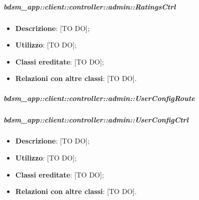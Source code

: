 		\subparagraph{bdsm\_app::client::controller::admin::RatingsCtrl} %
		\label{subp:bdsm_app_client_controller_admin_ratingsctrl}
			\begin{itemize}
				\item \textbf{Descrizione}: [TO DO];
				\item \textbf{Utilizzo}: [TO DO];
				\item \textbf{Classi ereditate}: [TO DO];
				\item \textbf{Relazioni con altre classi}: [TO DO].
			\end{itemize}

		\subparagraph{bdsm\_app::client::controller::admin::UserConfigRoute} %
		\label{subp:bdsm_app_client_controller_admin_userconfigroute}
		

		\subparagraph{bdsm\_app::client::controller::admin::UserConfigCtrl} %
		\label{subp:bdsm_app_client_controller_admin_userconfigctrl}
			\begin{itemize}
				\item \textbf{Descrizione}: [TO DO];
				\item \textbf{Utilizzo}: [TO DO];
				\item \textbf{Classi ereditate}: [TO DO];
				\item \textbf{Relazioni con altre classi}: [TO DO].
			\end{itemize}


